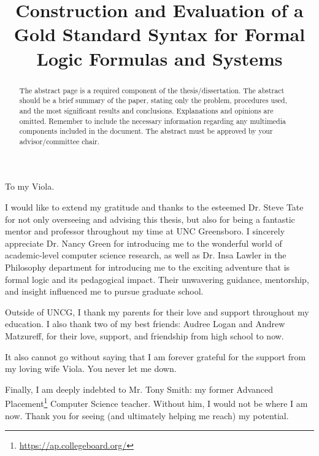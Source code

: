 \documentclass[ms]{uncgdissertationexp2}
\title{Construction and Evaluation of a Gold Standard Syntax for Formal Logic Formulas and Systems}
\theoremstyle{plain}
\theoremstyle{definition}
\theoremstyle{remark}
\begin{document}
\frontmatter      %
\doublespacing
\begin{abstract}
	The abstract page is a required component of the thesis/dissertation.
	The abstract should be a brief summary of the paper, stating only the
	problem, procedures used, and the most significant results and
	conclusions. Explanations and opinions are omitted. Remember to
	include the necessary information regarding any multimedia components
	included in the document. The abstract must be approved by your
	advisor/committee chair. 
\end{abstract}

\maketitlepage

\makecopyrightpage

\begin{dedication}
	To my Viola.
\end{dedication}

\makeapprovalpage

\begin{acknowledgments}
	I would like to extend my gratitude and thanks to the esteemed Dr. Steve Tate for not only overseeing and advising this thesis, but also for being a fantastic mentor and professor throughout my time at UNC Greensboro. I sincerely appreciate Dr. Nancy Green for introducing me to the wonderful world of academic-level computer science research, as well as Dr. Insa Lawler in the Philosophy department for introducing me to the exciting adventure that is formal logic and its pedagogical impact. Their unwavering guidance, mentorship, and insight influenced me to pursue graduate school.
	
	Outside of UNCG, I thank my parents for their love and support throughout my education. I also thank two of my best friends: Audree Logan and Andrew Matzureff, for their love, support, and friendship from high school to now.
	
	It also cannot go without saying that I am forever grateful for the support from my loving wife Viola. You never let me down.
	
	Finally, I am deeply indebted to Mr. Tony Smith: my former Advanced Placement\footnote{\url{https://ap.collegeboard.org/}} Computer Science teacher. Without him, I would not be where I am now. Thank you for seeing (and ultimately helping me reach) my potential.
\end{acknowledgments}
\end{document}
